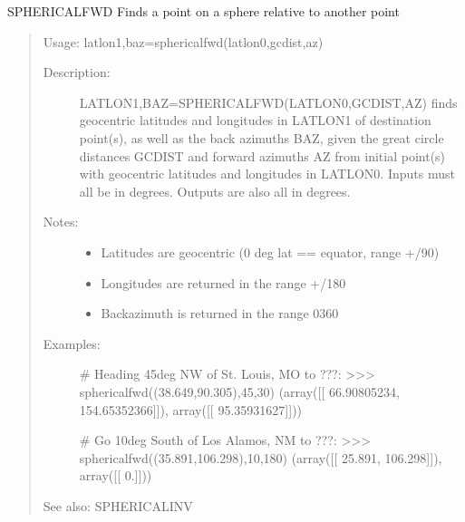 \documentclass[letterpaper,10pt,english]{sphinxmanual}
\begin{document}
\begin{fulllineitems}
\label{\detokenize{infrapy.utils:infrapy.utils.latlon.sphericalfwd}}
SPHERICALFWD    Finds a point on a sphere relative to another point
\begin{quote}

Usage:    latlon1,baz=sphericalfwd(latlon0,gcdist,az)
\begin{description}
\item[{Description:}] \leavevmode
LATLON1,BAZ=SPHERICALFWD(LATLON0,GCDIST,AZ) finds geocentric latitudes
and longitudes in LATLON1 of destination point(s), as well as the back
azimuths BAZ, given the great circle distances GCDIST and forward
azimuths AZ from initial point(s) with geocentric latitudes and
longitudes in LATLON0.  Inputs must all be in degrees.  Outputs are
also all in degrees.

\item[{Notes:}] \leavevmode\begin{itemize}
\item {} 
Latitudes are geocentric (0 deg lat == equator, range +/\sphinxhyphen{}90)

\item {} 
Longitudes are returned in the range +/\sphinxhyphen{}180

\item {} 
Backazimuth is returned in the range 0\sphinxhyphen{}360

\end{itemize}

\item[{Examples:}] \leavevmode
\# Heading 45deg NW of St. Louis, MO to ???:
\textgreater{}\textgreater{}\textgreater{} sphericalfwd((38.649,\sphinxhyphen{}90.305),45,\sphinxhyphen{}30)
(array({[}{[}  66.90805234, \sphinxhyphen{}154.65352366{]}{]}), array({[}{[} 95.35931627{]}{]}))

\# Go 10deg South of Los Alamos, NM to ???:
\textgreater{}\textgreater{}\textgreater{} sphericalfwd((35.891,106.298),10,180)
(array({[}{[}  25.891,  106.298{]}{]}), array({[}{[} 0.{]}{]}))

\end{description}

See also: SPHERICALINV
\end{quote}

\end{fulllineitems}
\end{document}
